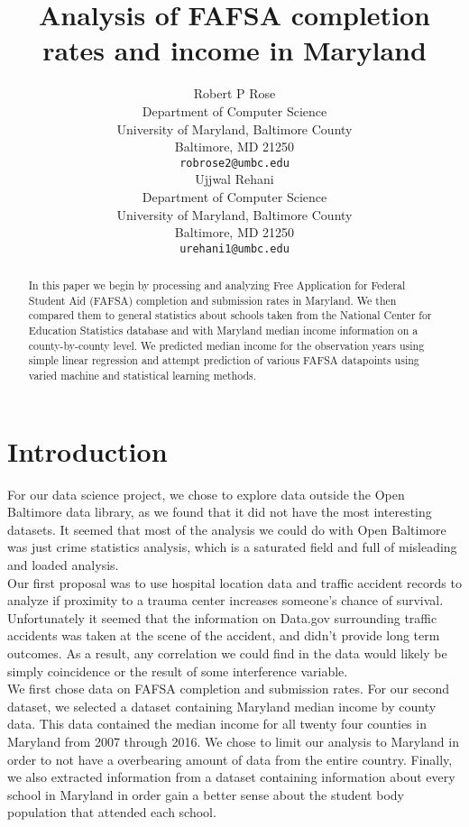 \documentclass[12pt]{article}
\title{Analysis of FAFSA completion rates and income in Maryland}
\author{
  Robert P Rose \\
  Department of Computer Science\\
  University of Maryland, Baltimore County\\
  Baltimore, MD 21250 \\
  \texttt{robrose2@umbc.edu} \\
   \And
  Ujjwal Rehani \\
  Department of Computer Science\\
  University of Maryland, Baltimore County\\
  Baltimore, MD 21250 \\
  \texttt{urehani1@umbc.edu} \\
}
\begin{document}
\maketitle

\begin{abstract}
In this paper we begin by processing and analyzing Free Application for Federal
Student Aid (FAFSA) completion and submission rates in Maryland. We then compared them to 
general statistics about schools taken from the National Center for Education 
Statistics database and with Maryland median income information on a 
county-by-county level. We predicted median income for the observation years using 
simple linear regression and attempt prediction of various FAFSA datapoints using 
varied machine and statistical learning methods. \\
\end{abstract}

\section{Introduction}
For our data science project, we chose to explore data outside the Open Baltimore
data library, as we found that it did not have the most interesting datasets. It
seemed that most of the analysis we could do with Open Baltimore was just crime
statistics analysis, which is a saturated field and full of misleading and 
loaded analysis.\cite{weatherburn2011} \\

Our first proposal was to use hospital location data and traffic accident records
to analyze if proximity to a trauma center increases someone's chance of survival.
Unfortunately it seemed that the information on Data.gov surrounding traffic
accidents was taken at the scene of the accident, and didn't provide long term
outcomes. As a result, any correlation we could find in the data would likely be
simply coincidence or the result of some interference variable. \\

We first chose data on FAFSA completion and submission rates. For our second dataset, we selected a dataset containing Maryland median income by county data. This data contained the median income for all twenty four counties in Maryland from 2007 through 2016. We chose to limit our analysis to Maryland in order to not have a overbearing amount of data from the entire country. Finally, we also extracted information from a dataset containing information about every school in Maryland in order gain a better sense about the student body population that attended each school.
\end{document}
